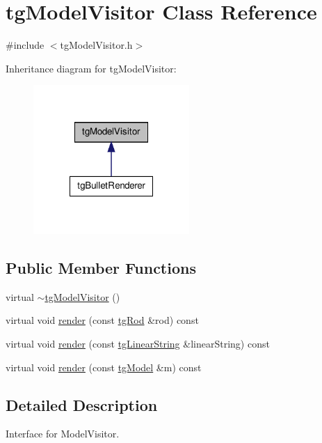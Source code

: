 \hypertarget{classtg_model_visitor}{\section{tg\-Model\-Visitor Class Reference}
\label{classtg_model_visitor}
}


{\ttfamily \#include $<$tg\-Model\-Visitor.\-h$>$}



Inheritance diagram for tg\-Model\-Visitor\-:\nopagebreak
\begin{figure}[H]
\begin{center}
\leavevmode
\includegraphics[width=168pt]{classtg_model_visitor__inherit__graph}
\end{center}
\end{figure}
\subsection*{Public Member Functions}
\begin{DoxyCompactItemize}
\item 
virtual \hyperlink{classtg_model_visitor_a6a5672d43509bd3125f74cc3b5c0fb12}{$\sim$tg\-Model\-Visitor} ()
\item 
virtual void \hyperlink{classtg_model_visitor_a69d056cf31bb4eeef03c243a86f59cc1}{render} (const \hyperlink{classtg_rod}{tg\-Rod} \&rod) const 
\item 
virtual void \hyperlink{classtg_model_visitor_a2f48f15116ed7e28162ca154efcde403}{render} (const \hyperlink{classtg_linear_string}{tg\-Linear\-String} \&linear\-String) const 
\item 
virtual void \hyperlink{classtg_model_visitor_ac8567b6bbe2c62ddc44c11136502261b}{render} (const \hyperlink{classtg_model}{tg\-Model} \&m) const 
\end{DoxyCompactItemize}


\subsection{Detailed Description}
Interface for Model\-Visitor. 

